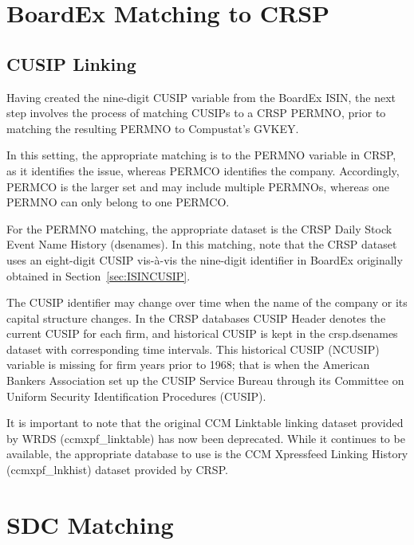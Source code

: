 \documentclass[12pt]{article}
\begin{document}
\section{BoardEx Matching to CRSP}\label{sec:BoardexCRSP}

\subsection{CUSIP Linking}\label{sec:CRSPCUSIPmatch}

Having created the nine-digit CUSIP variable from the BoardEx ISIN, the next step involves the process of matching CUSIPs to a CRSP PERMNO, prior to matching the resulting PERMNO to Compustat's GVKEY.

In this setting, the appropriate matching is to the PERMNO variable in CRSP, as it identifies the issue, whereas PERMCO identifies the company.
Accordingly, PERMCO is the larger set and may include multiple PERMNOs, whereas one PERMNO can only belong to one PERMCO.

For the PERMNO matching, the appropriate dataset is the CRSP Daily Stock Event Name History (dsenames).
In this matching, note that the CRSP dataset uses an eight-digit CUSIP vis-\`{a}-vis the nine-digit identifier in BoardEx originally obtained in Section~\ref{sec:ISINCUSIP}.

The CUSIP identifier may change over time when the name of the company or its capital structure changes.
In the CRSP databases CUSIP Header denotes the current CUSIP for each firm, and historical CUSIP is kept in the crsp.dsenames dataset with corresponding time intervals.
This historical CUSIP (NCUSIP) variable is missing for firm years prior to 1968; that is when the American Bankers Association set up the CUSIP Service Bureau through its Committee on Uniform Security Identification Procedures (CUSIP).



It is important to note that the original CCM Linktable linking dataset provided by WRDS (ccmxpf\_linktable) has now been deprecated.
While it continues to be available, the appropriate database to use is the CCM Xpressfeed Linking History (ccmxpf\_lnkhist) dataset provided by CRSP.


\section{SDC Matching}\label{sec:SDC}
\end{document}
